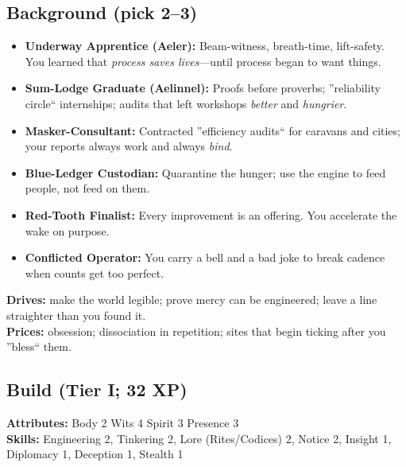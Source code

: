 \documentclass[11pt]{article}
\begin{document}
\subsection*{Background (pick 2--3)}
\begin{itemize}[leftmargin=*]
  \item \textbf{Underway Apprentice (Aeler):} Beam-witness, breath-time, lift-safety. You learned that \emph{process saves lives}---until process began to want things.
  \item \textbf{Sum-Lodge Graduate (Aelinnel):} Proofs before proverbs; ''reliability circle`` internships; audits that left workshops \emph{better} and \emph{hungrier}.
  \item \textbf{Masker-Consultant:} Contracted ''efficiency audits`` for caravans and cities; your reports always work and always \emph{bind}.
  \item \textbf{Blue-Ledger Custodian:} Quarantine the hunger; use the engine to feed people, not feed on them.
  \item \textbf{Red-Tooth Finalist:} Every improvement is an offering. You accelerate the wake on purpose.
  \item \textbf{Conflicted Operator:} You carry a bell and a bad joke to break cadence when counts get too perfect.
\end{itemize}

\noindent\textbf{Drives:} make the world legible; prove mercy can be engineered; leave a line straighter than you found it. \\
\textbf{Prices:} obsession; dissociation in repetition; sites that begin ticking after you ''bless`` them.

\subsection*{Build (Tier I; 32 XP)}
\textbf{Attributes:} Body 2 \quad Wits 4 \quad Spirit 3 \quad Presence 3 \\
\textbf{Skills:} Engineering 2, Tinkering 2, Lore (Rites/Codices) 2, Notice 2, Insight 1, Diplomacy 1, Deception 1, Stealth 1
\end{document}
